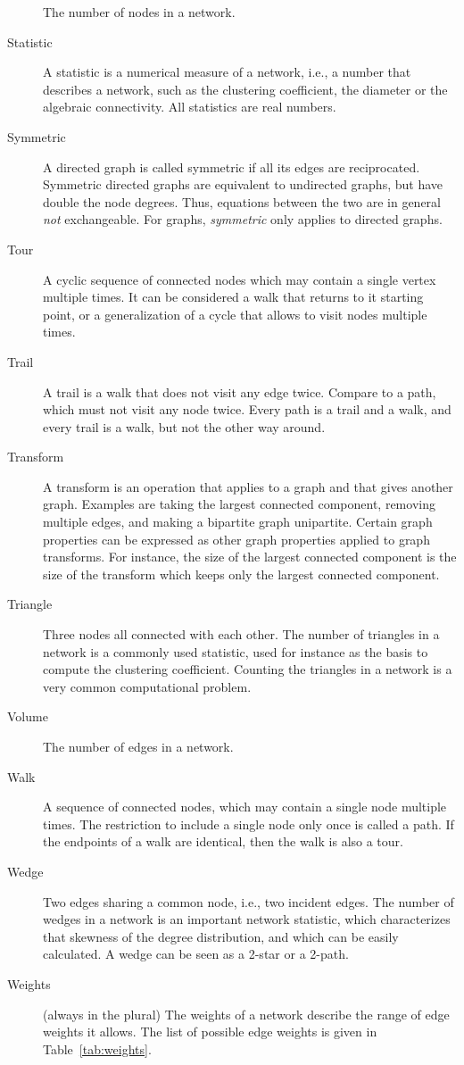 \documentclass{article}
\begin{document}
\begin{description}
    The number of nodes in a network.  
  \item[Statistic]
    A statistic is a numerical measure of a network, i.e., a number that
    describes a network, such as the clustering coefficient, the
    diameter or the algebraic connectivity.  All statistics are real
    numbers.   
  \item[Symmetric] A directed graph is called symmetric if all its edges
    are reciprocated.  Symmetric directed graphs are equivalent to
    undirected graphs, but have double the node degrees.  Thus,
    equations between the two are in general \emph{not} exchangeable.
    For graphs, \emph{symmetric} only applies to directed graphs. 
  \item[Tour]
    A cyclic sequence of connected nodes which may contain a single
    vertex multiple times.  It can be considered a walk that returns to
    it starting point, or a generalization of a cycle that allows to
    visit nodes multiple times.  
  \item[Trail] A trail is a walk that does not visit any edge twice.
    Compare to a path, which must not visit any node twice.  Every path
    is a trail and a walk, and every trail is a walk, but not the other
    way around. 
  \item[Transform] 
    A transform is an operation that applies to a graph and that gives
    another graph.  Examples are taking the largest connected component,
    removing multiple edges, and making a bipartite graph unipartite.
    Certain graph properties can be expressed as other graph properties
    applied to graph transforms.  For instance, the size of the largest
    connected component is the size of the transform which keeps only
    the largest connected component. 
  \item[Triangle]
    Three nodes all connected with each other.  The number of triangles
    in a network is a commonly used statistic, used for instance as
    the basis to compute the clustering coefficient.  Counting the
    triangles in a network is a very common computational problem.  
  \item[Volume]
    The number of edges in a network.  
  \item[Walk]
    A sequence of connected nodes, which may contain a single node
    multiple times.  The restriction to include a single node only once
    is called a path.  If the endpoints of a walk are identical, then
    the walk is also a tour.  
  \item[Wedge] 
    Two edges sharing a common node, i.e., two incident edges.  The
    number of wedges in a network is an important network statistic,
    which characterizes that skewness of the degree distribution, and
    which can be easily calculated.  A wedge can be seen as a 2-star or
    a 2-path.  
  \item[Weights] (always in the plural)
    The weights of a network describe the range of edge weights it
    allows.  The list of possible edge weights is given in
    Table~\ref{tab:weights}.  
\end{description}
\end{document}

